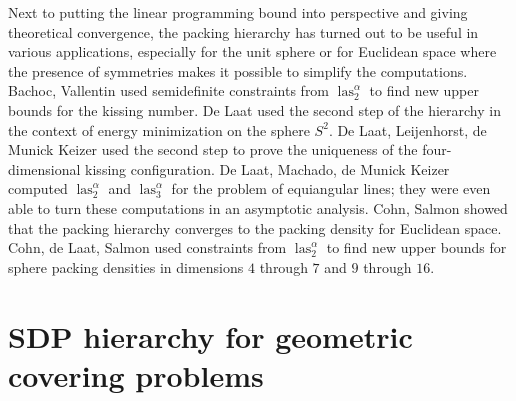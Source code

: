\documentclass{amsart}
\DeclareMathOperator{\las}{las}
\begin{document}
 Next to putting the linear programming bound into perspective and
 giving theoretical convergence, the packing hierarchy has turned out to be
 useful in various applications, especially for the unit sphere or for
 Euclidean space where the presence of symmetries makes it possible to
 simplify the computations.  Bachoc, Vallentin
 \cite{Bachoc-Vallentin-2008} used semidefinite constraints from
 $\las^\alpha_2$ to find new upper bounds for the kissing number. De Laat
 \cite{de-Laat-2020} used the second step of the hierarchy in the
 context of energy minimization on the sphere $S^2$. De Laat, Leijenhorst, de Munick Keizer \cite{de-Laat-Leijenhorst-de-Munick-Keizer-2024} used the second step
 to prove the uniqueness of the four-dimensional kissing configuration. De Laat,
 Machado, de Munick Keizer
 \cite{de-Laat-Machado-de-Munick-Keizer-2022} computed $\las^\alpha_2$ and
 $\las^\alpha_3$ for the problem of equiangular lines; they were even able to
 turn these computations in an asymptotic analysis.  Cohn, Salmon
 \cite{Cohn-Salmon-2021} showed that the packing hierarchy
 converges to the packing density for Euclidean space. Cohn, de Laat,
 Salmon \cite{Cohn-de-Laat-Salmon-2022} used constraints from $\las^\alpha_2$
 to find new upper bounds for sphere packing densities in dimensions $4$
 through $7$ and $9$ through $16$.
 
%
%
%

 \section{SDP hierarchy for geometric covering problems}
\label{sec:covering-hierarchy}
\end{document}
